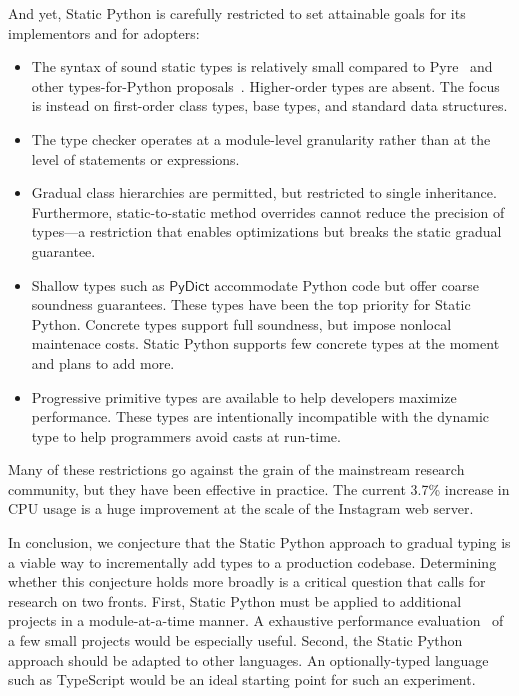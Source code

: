 \documentclass[english,cleveref,submission]{programming}
\newcommand{\SP}{Static Python}
\newcommand{\CPUchange}{3.7\%}
\newcommand{\typefont}[1]{\mathsf{#1}}
\newcommand{\sptrawpydict}{\typefont{PyDict}}
\begin{document}
And yet, \SP{} is carefully restricted to set attainable goals
for its implementors and for adopters:
\begin{itemize}
  \item
    The syntax of sound static types is relatively small compared
    to Pyre~\cite{pyre} and other types-for-Python proposals~\cite{mypy,pytype}.
    Higher-order types are absent.
    The focus is instead on first-order class types, base types, and standard data structures.
  \item
    The type checker operates at a module-level granularity rather
    than at the level of statements or expressions.
  \item
    Gradual class hierarchies are permitted, but restricted to single inheritance.
    Furthermore, static-to-static method overrides cannot reduce the precision of types---a restriction
    that enables optimizations but breaks the static gradual guarantee.
  \item
    Shallow types such as $\sptrawpydict$ accommodate Python code but offer coarse
    soundness guarantees.
    These types have been the top priority for \SP{}.
    Concrete types support full soundness, but impose nonlocal maintenace costs.
    \SP{} supports few concrete types at the moment and plans to add more.
  \item
    Progressive primitive types are available to help developers maximize performance.
    These types are intentionally incompatible with the dynamic type to help programmers
    avoid casts at run-time.
\end{itemize}
%
Many of these restrictions go against the grain of the mainstream
research community, but they have been effective in practice.
The current \CPUchange{} increase in CPU usage is a huge improvement
at the scale of the Instagram web server.

In conclusion, we conjecture that the \SP{} approach to gradual typing
is a viable way to incrementally add types to a production codebase.
Determining whether this conjecture holds more broadly is a critical
question that calls for research on two fronts.
First, \SP{} must be applied to additional projects in a module-at-a-time manner.
A exhaustive performance evaluation~\cite{gtnffvf-jfp-2019} of a few small projects would be
especially useful.
Second, the \SP{} approach should be adapted to other languages.
An optionally-typed language such as TypeScript would be an ideal starting
point for such an experiment.


\end{document}
